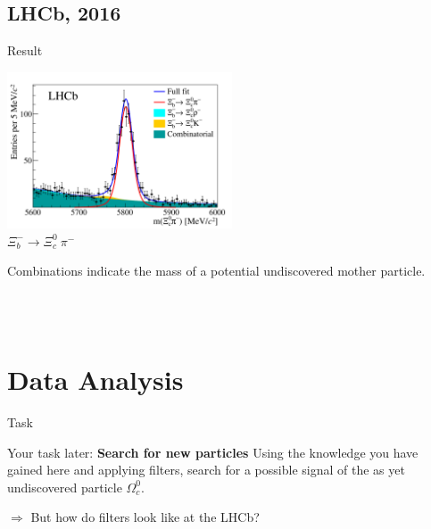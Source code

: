    \subsection{LHCb, 2016}
\begin{frame}{Result}
    




\begin{center}
\includegraphics[width=0.5\textwidth]{Figures Lecture on Datanalysis/Resonance_Xi_c_-.png}\\
    $\Xi_b^- \rightarrow \Xi_c^0 ~\pi^-$ \vspace{0.5cm}

     
        Combinations indicate the mass of a potential undiscovered mother particle. \vspace{0.5cm}
             
              
               \begin{minipage} {0.4\textwidth}\\
               \\
              
               \end{minipage}
               \end{center}
        

\end{frame}
\subsection{} 
\section{Data Analysis} 

\begin{frame}{Task}
\begin{block}{Your task later: \textbf{Search for new particles}}
    Using the knowledge you have gained here and applying filters, search for a possible signal of the as yet undiscovered particle $\Omega_c^0$.
\end{block}
$\Rightarrow$ But how do filters look like at the LHCb?
    
\end{frame}



